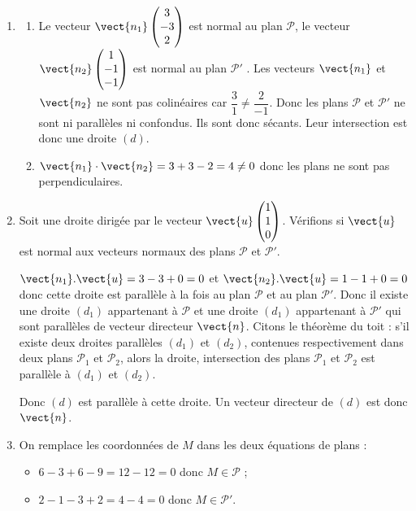 \begin{enumerate}[resume]
	\item 
	\begin{enumerate}
		\item Le vecteur $\vect{n_1}\begin{pmatrix}3\\-3\\2\end{pmatrix}$ est normal au plan $\mathcal{P}$, le vecteur $\vect{n_2}\begin{pmatrix}1\\-1\\-1\end{pmatrix}$ est normal au plan $\mathcal{P}'$ . Les vecteurs $\vect{n_1}$ et $\vect{n_2}$ ne sont pas colinéaires car $\dfrac{3}{1}\neq \dfrac{2}{-1}$. Donc les plans $\mathcal{P}$ et $\mathcal{P}'$ ne sont ni parallèles ni confondus. Ils sont donc sécants. Leur intersection est donc une droite $(d)$.
		\item $\vect{n_1}\cdot \vect{n_2}=3+3-2=4\neq 0$ donc les plans ne sont pas perpendiculaires.
\end{enumerate}
	\item Soit une droite dirigée par le vecteur $\vect{u}\begin{pmatrix}1\\1\\0\end{pmatrix}$. Vérifions si $\vect{u}$ est normal aux vecteurs normaux des plans $\mathcal{P}$ et $\mathcal{P}'$.
	
	$\vect{n_1}.\vect{u}=3-3+0=0$ et $\vect{n_2}.\vect{u}=1-1+0=0$ donc cette droite est parallèle à la fois au plan $\mathcal{P}$ et au plan $\mathcal{P}'$. Donc il existe une droite $(d_1)$ appartenant à $\mathcal{P}$ et une droite $(d_1)$ appartenant à $\mathcal{P}'$ qui sont parallèles de vecteur directeur $\vect{n}$.
	Citons le théorème du toit : s'il existe deux droites parallèles $(d_1)$ et $(d_2)$, contenues respectivement dans deux plans $\mathcal{P}_1$ et $\mathcal{P}_2$, alors la droite, intersection des plans $\mathcal{P}_1$ et $\mathcal{P}_2$ est parallèle à $(d_1)$ et $(d_2)$.
	
Donc $(d)$ est parallèle à cette droite. Un vecteur directeur de $(d)$ est donc $\vect{n}$.
	\item On remplace les coordonnées de $M$ dans les deux équations de plans :
\begin{itemize}
\item $6-3+6-9=12-12=0$ donc $M\in \mathcal{P}$ ;
\item $2-1-3+2=4-4=0$ donc $M\in \mathcal{P}'$.
\end{itemize}


\end{enumerate}

